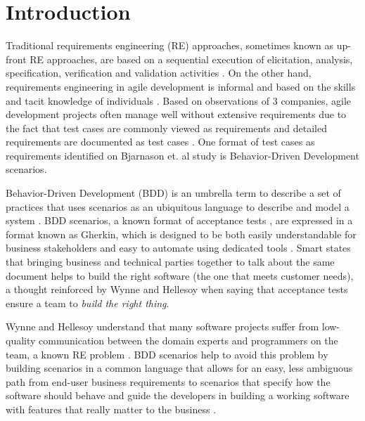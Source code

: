 \chapter{\label{chap:chap1}{Introduction}}

Traditional requirements engineering (RE) approaches, sometimes known as up-front RE approaches, are based on a sequential execution of elicitation, analysis, specification, verification and validation activities \cite{Heikkila_et_dot_al_2015}. On the other hand, requirements engineering in agile development is informal and based on the skills and tacit knowledge of individuals \cite{Heikkila_et_dot_al_2015}. Based on observations of 3 companies, agile development projects often manage well without extensive requirements due to the fact that test cases are commonly viewed as requirements and detailed requirements are documented as test cases \cite{Bjarnason_et_dot_al_2016}. One format of test cases as requirements identified on Bjarnason et. al \cite{Bjarnason_et_dot_al_2016} study is Behavior-Driven Development scenarios.

Behavior-Driven Development (BDD) is an umbrella term to describe a set of practices that uses scenarios as an ubiquitous language to describe and model a system \cite{Smart_2014}. BDD scenarios, a known format of acceptance tests \cite{Gartner_2012}, are expressed in a format known as Gherkin, which is designed to be both easily understandable for business stakeholders and easy to automate using dedicated tools \cite{Smart_2014}. Smart \cite{Smart_2014} states that bringing business and technical parties together to talk about the same document helps to build the right software (the one that meets customer needs), a thought reinforced by Wynne and Hellesoy \cite{Wynne_and_Hellesoy_2012} when saying that acceptance tests ensure a team to \textit{build the right thing}. 

Wynne and Hellesoy \cite{Wynne_and_Hellesoy_2012} understand that many software projects suffer from low-quality communication between the domain experts and programmers on the team, a known RE problem \cite{Fernandez_et_dot_al_2017}. BDD scenarios help to avoid this problem by building scenarios in a common language that allows for an easy, less ambiguous path from end-user business requirements to scenarios that specify how the software should behave and guide the developers in building a working software with features that really matter to the business \cite{Smart_2014}.  

